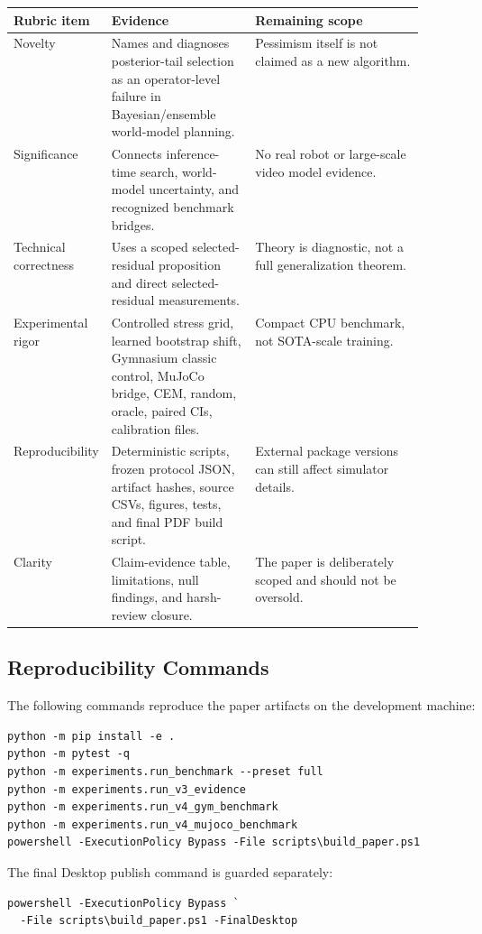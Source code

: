 \documentclass{article}
\begin{document}
\begin{center}
\small
\begin{tabularx}{\linewidth}{p{0.18\linewidth}p{0.35\linewidth}X}
\toprule
Rubric item & Evidence & Remaining scope \\
\midrule
Novelty &
Names and diagnoses posterior-tail selection as an operator-level failure in
Bayesian/ensemble world-model planning. &
Pessimism itself is not claimed as a new algorithm. \\
Significance &
Connects inference-time search, world-model uncertainty, and recognized
benchmark bridges. &
No real robot or large-scale video model evidence. \\
Technical correctness &
Uses a scoped selected-residual proposition and direct selected-residual
measurements. &
Theory is diagnostic, not a full generalization theorem. \\
Experimental rigor &
Controlled stress grid, learned bootstrap shift, Gymnasium classic control,
MuJoCo bridge, CEM, random, oracle, paired CIs, calibration files. &
Compact CPU benchmark, not SOTA-scale training. \\
Reproducibility &
Deterministic scripts, frozen protocol JSON, artifact hashes, source CSVs,
figures, tests, and final PDF build script. &
External package versions can still affect simulator details. \\
Clarity &
Claim-evidence table, limitations, null findings, and harsh-review closure. &
The paper is deliberately scoped and should not be oversold. \\
\bottomrule
\end{tabularx}
\end{center}

\subsection{Reproducibility Commands}

The following commands reproduce the paper artifacts on the development
machine:
\begin{verbatim}
python -m pip install -e .
python -m pytest -q
python -m experiments.run_benchmark --preset full
python -m experiments.run_v3_evidence
python -m experiments.run_v4_gym_benchmark
python -m experiments.run_v4_mujoco_benchmark
powershell -ExecutionPolicy Bypass -File scripts\build_paper.ps1
\end{verbatim}

The final Desktop publish command is guarded separately:
\begin{verbatim}
powershell -ExecutionPolicy Bypass `
  -File scripts\build_paper.ps1 -FinalDesktop
\end{verbatim}
\end{document}
